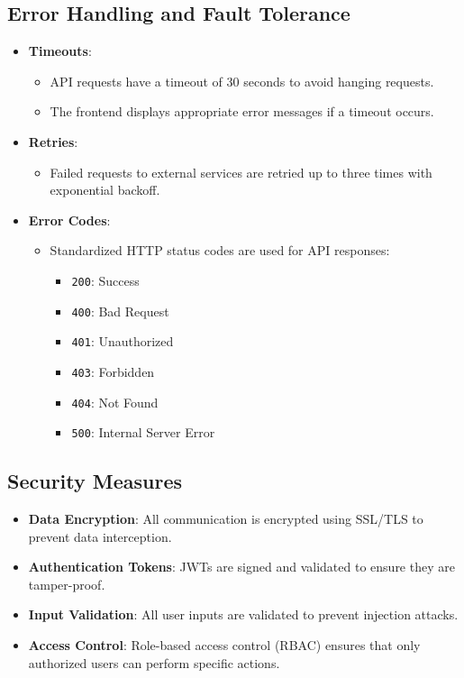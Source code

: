 \documentclass[12pt, titlepage]{article}
\begin{document}
\subsection*{Error Handling and Fault Tolerance}
\begin{itemize}
    \item \textbf{Timeouts}:
    \begin{itemize}
        \item API requests have a timeout of 30 seconds to avoid hanging requests.
        \item The frontend displays appropriate error messages if a timeout occurs.
    \end{itemize}
    \item \textbf{Retries}:
    \begin{itemize}
        \item Failed requests to external services are retried up to three times with exponential backoff.
    \end{itemize}
    \item \textbf{Error Codes}:
    \begin{itemize}
        \item Standardized HTTP status codes are used for API responses:
        \begin{itemize}
            \item \texttt{200}: Success
            \item \texttt{400}: Bad Request
            \item \texttt{401}: Unauthorized
            \item \texttt{403}: Forbidden
            \item \texttt{404}: Not Found
            \item \texttt{500}: Internal Server Error
        \end{itemize}
    \end{itemize}
\end{itemize}

\subsection*{Security Measures}
\begin{itemize}
    \item \textbf{Data Encryption}: All communication is encrypted using SSL/TLS to prevent data interception.
    \item \textbf{Authentication Tokens}: JWTs are signed and validated to ensure they are tamper-proof.
    \item \textbf{Input Validation}: All user inputs are validated to prevent injection attacks.
    \item \textbf{Access Control}: Role-based access control (RBAC) ensures that only authorized users can perform specific actions.
\end{itemize}
\end{document}
